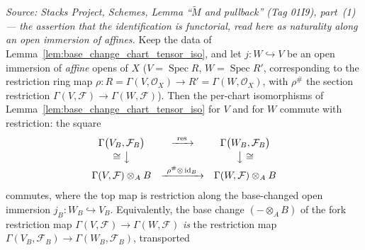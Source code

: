 \begin{lemma}
  \label{lem:pullback_tilde_restriction_natural}
  \textit{Source: Stacks Project, Schemes, Lemma ``\(\widetilde M\) and pullback''
  (Tag 01I9), part~(1) — the assertion that the identification is \emph{functorial},
  read here as naturality along an open immersion of affines.}
  Keep the data of Lemma~\ref{lem:base_change_chart_tensor_iso}, and let
  \(j : W \hookrightarrow V\) be an open immersion of \emph{affine} opens of \(X\)
  (\(V = \operatorname{Spec} R\), \(W = \operatorname{Spec} R'\), corresponding to the
  restriction ring map \(\rho : R = \Gamma(V,\mathcal{O}_X) \to R' = \Gamma(W,\mathcal{O}_X)\),
  with \(\rho^{\#}\) the section restriction
  \(\Gamma(V,\mathcal{F}) \to \Gamma(W,\mathcal{F})\)). Then the per-chart isomorphisms of
  Lemma~\ref{lem:base_change_chart_tensor_iso} for \(V\) and for \(W\) commute with
  restriction: the square
  \[
    \begin{array}{ccc}
      \Gamma\bigl(V_B,\mathcal{F}_B\bigr) & \xrightarrow{\ \operatorname{res}\ }
        & \Gamma\bigl(W_B,\mathcal{F}_B\bigr) \\[2pt]
      \cong\big\downarrow & & \big\downarrow\cong \\[2pt]
      \Gamma(V,\mathcal{F}) \otimes_A B & \xrightarrow{\ \rho^{\#}\otimes\,\mathrm{id}_B\ }
        & \Gamma(W,\mathcal{F}) \otimes_A B
    \end{array}
  \]
  commutes, where the top map is restriction along the base-changed open immersion
  \(j_B : W_B \hookrightarrow V_B\). Equivalently, the base change \((- \otimes_A B)\) of the
  fork restriction map \(\Gamma(V,\mathcal{F}) \to \Gamma(W,\mathcal{F})\) \emph{is} the
  restriction map \(\Gamma(V_B,\mathcal{F}_B) \to \Gamma(W_B,\mathcal{F}_B)\), transported

\end{lemma}
